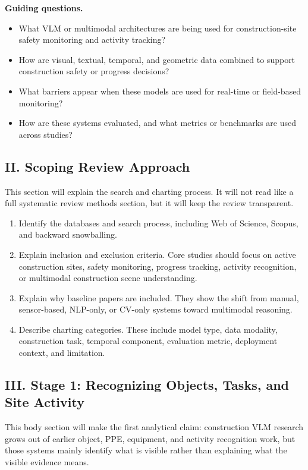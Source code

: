 \documentclass[10pt, letterpaper]{article}
\begin{document}
\textbf{Guiding questions.}

\begin{itemize}
\item What VLM or multimodal architectures are being used for construction-site safety monitoring and activity tracking?
\item How are visual, textual, temporal, and geometric data combined to support construction safety or progress decisions?
\item What barriers appear when these models are used for real-time or field-based monitoring?
\item How are these systems evaluated, and what metrics or benchmarks are used across studies?
\end{itemize}

\subsection{II. Scoping Review Approach}

This section will explain the search and charting process. It will not read like a full systematic review methods section, but it will keep the review transparent.

\begin{enumerate}
\item Identify the databases and search process, including Web of Science, Scopus, and backward snowballing.
\item Explain inclusion and exclusion criteria. Core studies should focus on active construction sites, safety monitoring, progress tracking, activity recognition, or multimodal construction scene understanding.
\item Explain why baseline papers are included. They show the shift from manual, sensor-based, NLP-only, or CV-only systems toward multimodal reasoning.
\item Describe charting categories. These include model type, data modality, construction task, temporal component, evaluation metric, deployment context, and limitation.
\end{enumerate}

\subsection{III. Stage 1: Recognizing Objects, Tasks, and Site Activity}

This body section will make the first analytical claim: construction VLM research grows out of earlier object, PPE, equipment, and activity recognition work, but those systems mainly identify what is visible rather than explaining what the visible evidence means.
\end{document}
